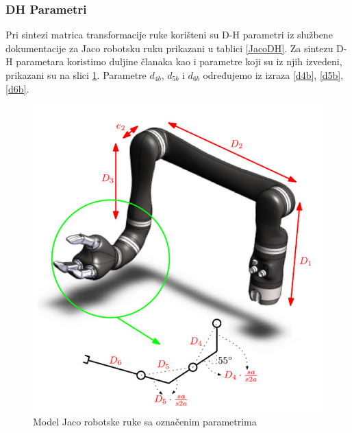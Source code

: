 \documentclass[times, utf8, diplomski, numeric]{fer}
\begin{document}
\subsubsection{DH Parametri}
Pri sintezi matrica transformacije ruke korišteni su D-H parametri iz službene dokumentacije za Jaco robotsku ruku prikazani u tablici \ref{JacoDH}. 
Za sintezu D-H parametara koristimo duljine članaka kao i parametre koji su iz njih izvedeni, prikazani su na slici \ref{jacoparam}.
Parametre $d_{4b}$, $d_{5b}$ i $d_{6b}$ određujemo iz izraza \ref{d4b}, \ref{d5b}, \ref{d6b}.
\begin{figure}[h!]
\centering
\includegraphics[scale=0.35]{jacoDH1}
\caption{Model Jaco robotske ruke sa označenim parametrima} \label{jacoparam}
\end{figure}
\end{document}
